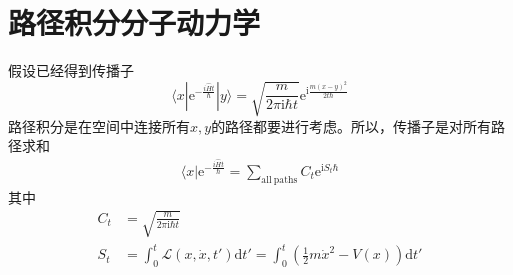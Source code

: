     \section{路径积分分子动力学}
        假设已经得到传播子
        \begin{equation*}
            \langle x | \mathrm{e}^{-\frac {i \hat{H}t}{\hbar}} |y \rangle = \sqrt{\frac m{2\pi \mathrm{i}\hbar t}} \mathrm{e}^{\mathrm{i}\frac {m(x-y)^2}{2t\hbar}}
        \end{equation*}
        路径积分是在空间中连接所有$x,y$的路径都要进行考虑。所以，传播子是对所有路径求和
        \begin{align*}
            \langle x | \mathrm{e}^{-\frac {i \hat{H}t}{\hbar}} = \sum_{\mathrm{all~paths}} C_t \mathrm{e}^{\mathrm{i}S_t\hbar}
        \end{align*}
        其中 
        \begin{align*}
            C_t &= \sqrt{\frac m{2\pi \mathrm{i}\hbar t}} \\
            S_t &= \int_0^t \mathcal{L}(x,\dot{x},t') \mathrm{d}t' = \int_0^t (\frac 12 m \dot{x}^2 - V(x)) \mathrm{d}t'
        \end{align*}

